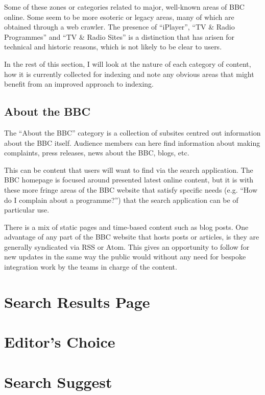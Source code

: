 Some of these zones or categories related to major, well-known areas of
BBC online. Some seem to be more esoteric or legacy areas, many of which
are obtained through a web crawler. The presence of ``iPlayer'',
``TV \& Radio Programmes'' and ``TV & Radio Sites'' is a distinction that
has arisen for technical and historic reasons, which is not likely to be
clear to users.

In the rest of this section, I will look at the nature of each category
of content, how it is currently collected for indexing and note any
obvious areas that might benefit from an improved approach to indexing.

\subsection{About the BBC}

The ``About the BBC'' category is a collection of subsites centred out
information about the BBC itself. Audience members can here find information
about making complaints, press releases, news about the BBC, blogs, etc.

This can be content that users will want to find via the search application.
The BBC homepage is focused around presented latest online content, but it
is with these more fringe areas of the BBC website that satisfy specific
needs (e.g. ``How do I complain about a programme?'') that the
search application can be of particular use.

There is a mix of static pages and time-based content such as blog posts.
One advantage of any part of the BBC website that hosts posts or articles,
is they are generally syndicated via RSS or Atom. This gives an opportunity
to follow for new updates in the same way the public would without any
need for bespoke integration work by the teams in charge of the content.

\section{Search Results Page}

\section{Editor's Choice}

\section{Search Suggest}
